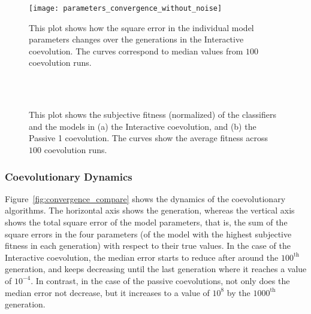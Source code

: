 \begin{figure}[!t]%
	   \centering
	   \texttt{[image: parameters\_convergence\_without\_noise]}
	    \caption{This plot shows how the square error in the individual model parameters
	    changes over the generations in the Interactive coevolution. The curves correspond to median values from $100$ coevolution runs.\label{fig:parameters_convergence}}
\end{figure}

\begin{figure}[!t]%
	\centering
		\\
		\\
		\caption{This plot shows the subjective fitness (normalized) of the classifiers and
		the models in (a) the Interactive coevolution, and (b) the Passive 1 coevolution.
		The curves show the average fitness across $100$ coevolution runs.\label{fig:fitness_dynamics}}
\end{figure}

\subsubsection{Coevolutionary Dynamics}\label{sec:coevolutionary_dynamic_deterministic_interaction}

Figure~\ref{fig:convergence_compare} shows the dynamics of the coevolutionary algorithms. The horizontal axis shows the generation, whereas the vertical axis shows the total square error of the model parameters, that is, the sum of the square errors in the four parameters (of the model with the highest subjective fitness in each generation) with respect to their true values. In the case of the Interactive coevolution, the median error starts to reduce after around the $100^\textrm{th}$ generation,  and keeps decreasing until the last generation where it reaches a value of $10^{-4}$. In contrast, in the case of the passive coevolutions, not only does the median error not decrease, but it increases to a value of $10^{8}$ by the $1000^\textrm{th}$ generation.

